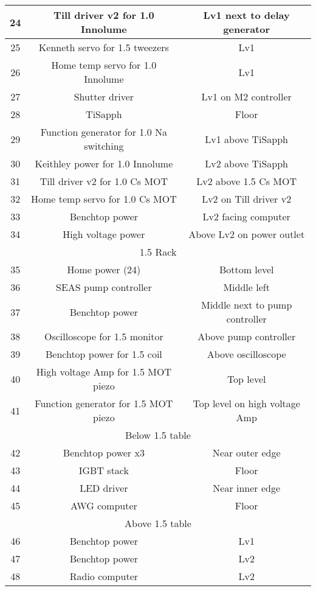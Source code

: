 \documentclass[10pt,fleqn,twocolumn]{article}
\begin{document}
\begin{longtable}{|c|c|c|}
  24&Till driver v2 for 1.0 Innolume&Lv1 next to delay generator\\\hline
  25&Kenneth servo for 1.5 tweezers&Lv1\\\hline
  26&Home temp servo for 1.0 Innolume&Lv1\\\hline
  27&Shutter driver&Lv1 on M2 controller\\\hline
  28&TiSapph&Floor\\\hline
  29&Function generator for 1.0 Na switching&Lv1 above TiSapph\\\hline
  30&Keithley power for 1.0 Innolume&Lv2 above TiSapph\\\hline
  31&Till driver v2 for 1.0 Cs MOT&Lv2 above 1.5 Cs MOT\\\hline
  32&Home temp servo for 1.0 Cs MOT&Lv2 on Till driver v2\\\hline
  33&Benchtop power&Lv2 facing computer\\\hline
  34&High voltage power&Above Lv2 on power outlet\\\hline
  \multicolumn{3}{|c|}{1.5 Rack}\\\hline
  35&Home power (24)&Bottom level\\\hline
  36&SEAS pump controller&Middle left\\\hline
  37&Benchtop power&Middle next to pump controller\\\hline
  38&Oscilloscope for 1.5 monitor&Above pump controller\\\hline
  39&Benchtop power for 1.5 coil&Above oscilloscope\\\hline
  40&High voltage Amp for 1.5 MOT piezo&Top level\\\hline
  41&Function generator for 1.5 MOT piezo&Top level on high voltage Amp\\\hline
  \multicolumn{3}{|c|}{Below 1.5 table}\\\hline
  42&Benchtop power x3&Near outer edge\\\hline
  43&IGBT stack&Floor\\\hline
  44&LED driver&Near inner edge\\\hline
  45&AWG computer&Floor\\\hline
  \multicolumn{3}{|c|}{Above 1.5 table}\\\hline
  46&Benchtop power&Lv1\\\hline
  47&Benchtop power&Lv2\\\hline
  48&Radio computer&Lv2\\\hline
\end{longtable}
\twocolumn
\end{document}
